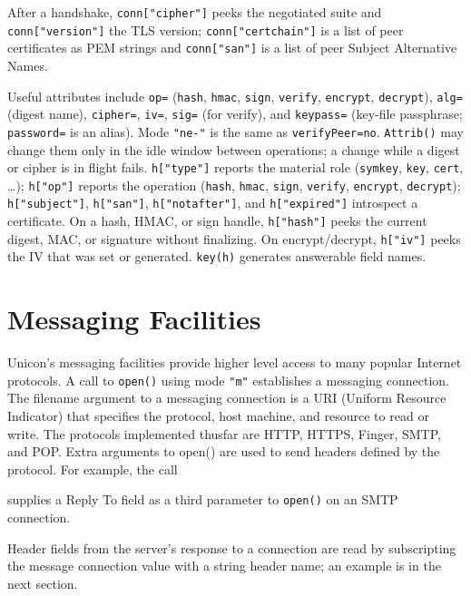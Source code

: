 After a handshake, \texttt{conn["cipher"]} peeks the negotiated
suite and \texttt{conn["version"]} the TLS version;
\texttt{conn["certchain"]} is a list of peer certificates
as PEM strings and \texttt{conn["san"]} is a list of peer
Subject Alternative Names.

Useful attributes include \texttt{op=} (\texttt{hash}, \texttt{hmac},
\texttt{sign}, \texttt{verify}, \texttt{encrypt}, \texttt{decrypt}),
\texttt{alg=} (digest name), \texttt{cipher=}, \texttt{iv=},
\texttt{sig=} (for verify), and \texttt{keypass=} (key-file passphrase;
\texttt{password=} is an alias). Mode \texttt{"ne-"} is the same as
\texttt{verifyPeer=no}. \texttt{Attrib()} may change them only in
the idle window between operations; a change while a digest or cipher
is in flight fails. \texttt{h["type"]} reports the material
role (\texttt{symkey}, \texttt{key}, \texttt{cert}, \ldots);
\texttt{h["op"]} reports the operation (\texttt{hash}, \texttt{hmac},
\texttt{sign}, \texttt{verify}, \texttt{encrypt}, \texttt{decrypt});
\texttt{h["subject"]}, \texttt{h["san"]}, \texttt{h["notafter"]}, and
\texttt{h["expired"]} introspect a certificate. On a hash, HMAC, or
sign handle, \texttt{h["hash"]} peeks
the current digest, MAC, or signature without finalizing. On encrypt/decrypt,
\texttt{h["iv"]} peeks the IV that was set or generated.
\texttt{key(h)} generates answerable field names.

\section{Messaging Facilities}

Unicon's messaging facilities provide
higher level access to many popular Internet protocols. A call to
\texttt{open()} using mode \texttt{"m"}
establishes a messaging connection. The filename argument to a
messaging connection is a URI (Uniform Resource Indicator) that
specifies the protocol, host machine, and resource to read or write.
The protocols implemented thusfar are HTTP, HTTPS, Finger, SMTP, and POP.
Extra arguments to open() are used to send headers defined by the
protocol. For example, the call


\noindent
supplies a Reply To field as a third parameter to \texttt{open()} on an
SMTP connection.

Header fields from the server's response to a
connection are read by subscripting the message connection value
with a string header name; an example is in the next section.

